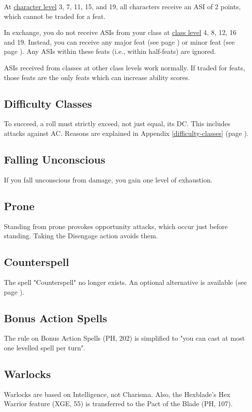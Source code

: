 \documentclass[letterpaper,twocolumn,openany,nodeprecatedcode,bg=print]{dndbook}
\newcommand{\pg}[1]{page \pageref{#1}}
\newcommand{\see}[1]{(see \pg{#1})}
\begin{document}
At \underline{character level} 3, 7, 11, 15, and 19, all characters receive an ASI of 2 points, which cannot be traded for a feat.

In exchange, you do not receive ASIs from your class at \underline{class level} 4, 8, 12, 16 and 19. Instead, you can receive any major feat \see{major-feats-table} or minor feat \see{minor-feats-table}. Any ASIs within these feats (i.e., within half-feats) are ignored.

ASIs received from classes at other class levels work normally. If traded for feats, those feats are the only feats which can increase ability scores.

\subsection{Difficulty Classes}
To succeed, a roll must strictly exceed, not just equal, its DC. 
This includes attacks against AC. 
Reasons are explained in Appendix \ref{difficulty-classes} (\pg{difficulty-classes}).

\subsection{Falling Unconscious}
If you fall unconscious from damage, you gain one level of exhaustion.

\subsection{Prone}
Standing from prone provokes opportunity attacks, which occur just before standing. 
Taking the Disengage action avoids them.

\subsection{Counterspell}
The spell "Counterspell" no longer exists. 
An optional alternative is available \see{counterspell}.

\subsection{Bonus Action Spells}
The rule on Bonus Action Spells (PH, 202) is simplified to
"you can cast at most one levelled spell per turn".

\subsection{Warlocks}
Warlocks are based on Intelligence, not Charisma. 
Also, the Hexblade's Hex Warrior feature (XGE, 55) is transferred to the Pact of the Blade (PH, 107).
\end{document}
